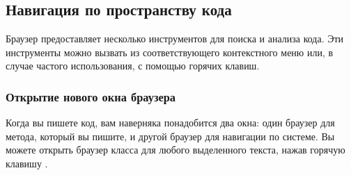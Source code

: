 \documentclass[a4paper,10pt,twoside]{book}
\begin{document}
\subsection{Навигация по пространству кода}


Браузер предоставляет несколько инструментов для поиска и анализа кода. Эти инструменты можно вызвать из соответствующего контекстного меню или, в случае частого использования, с помощью горячих клавиш.

\subsubsection{Открытие нового окна браузера}


Когда вы пишете код, вам наверняка понадобится два окна: один браузер для метода, который вы пишите, и другой браузер для навигации по системе. Вы можете открыть браузер класса для любого выделенного текста, нажав горячую клавишу  .


\end{document}
